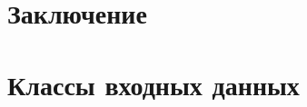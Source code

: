 \documentclass[12pt]{article}
\begin{document}
\newpage
\section{Заключение}


\newpage
\printbibliography

\appendix

\newpage
\section{Классы входных данных}

\end{document}
